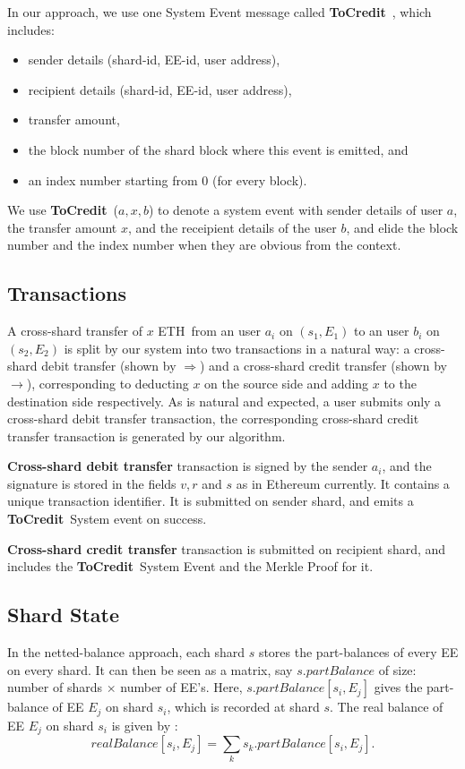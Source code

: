 \documentclass{IEEEtran}
\newcommand{\eth}[0]{ETH~}
\newcommand{\tocredit}[0]{{\bf ToCredit}~}
\begin{document}
In our approach, we use one System Event message called \tocredit, which includes:
\begin{itemize}
\item sender details (shard-id, EE-id, user address), 
\item recipient details (shard-id, EE-id, user address), 
\item transfer amount, 
\item the block number of the shard block where this event is emitted, and 
\item an index number starting from 0 (for every block).
\end{itemize}
We use \tocredit($a,x,b$) to denote a system event with sender details of user $a$, the transfer amount $x$, and the receipient details of the user $b$, and elide the block number and the index number when they are obvious from the context.

\subsection{Transactions}

A cross-shard transfer of $x$ \eth from an user $a_i$ on $(s_1,E_1)$ to an user $b_i$ on $(s_2,E_2)$ is split by our system into two transactions in a natural way: a cross-shard debit transfer (shown by $\Longrightarrow$) and a cross-shard credit transfer (shown by $\longrightarrow$), corresponding to deducting $x$ on the source side and adding $x$ to the destination side respectively. As is natural and expected, a user submits only a cross-shard debit transfer transaction, the corresponding cross-shard credit transfer transaction is generated by our algorithm.

{\bf Cross-shard debit transfer} transaction is signed by the sender $a_i$, and the signature is stored in the fields $v, r$ and $s$ as in   Ethereum currently. It contains a unique transaction identifier. It is submitted on sender shard, and emits a \tocredit System event on success.

{\bf Cross-shard credit transfer} transaction is submitted on recipient shard, and includes the \tocredit System Event and the Merkle Proof for it.

\subsection{Shard State}
In the netted-balance approach, each shard $s$ stores the part-balances of every EE on every shard. It can then be seen as a matrix, say $s.partBalance$ of size: number of shards $\times$ number of EE's. Here, $s.partBalance[s_i,E_j]$ gives the part-balance of EE $E_j$ on shard $s_i$, which is recorded at shard $s$. The real balance of EE $E_j$ on shard $s_i$ is given by : 
\[
	realBalance[s_i,E_j] = \sum_k s_k.partBalance[s_i,E_j].
\]
\end{document}
